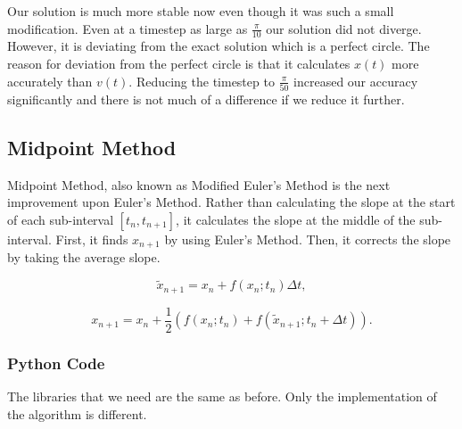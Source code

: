 \documentclass[11pt]{article}
\begin{document}
    Our solution is much more stable now even though it was such a small
modification. Even at a timestep as large as \(\frac{\pi}{10}\) our
solution did not diverge. However, it is deviating from the exact
solution which is a perfect circle. The reason for deviation from the
perfect circle is that it calculates \(x(t)\) more accurately than
\(v(t)\). Reducing the timestep to \(\frac{\pi}{50}\) increased our
accuracy significantly and there is not much of a difference if we
reduce it further.

    \hypertarget{midpoint-method}{%
\subsection{Midpoint Method}\label{midpoint-method}}

Midpoint Method, also known as Modified Euler's Method is the next
improvement upon Euler's Method. Rather than calculating the slope at
the start of each sub-interval \([t_n,t_{n+1}]\), it calculates the
slope at the middle of the sub-interval. First, it finds \(x_{n+1}\) by
using Euler's Method. Then, it corrects the slope by taking the average
slope.

\begin{equation}\label{eq:x_pred}
    \tilde{x}_{n+1} = x_n + f(x_n;t_n)\Delta t,
\end{equation}

\begin{equation}\label{eq:midpoint_method}
    x_{n+1} = x_n + \frac{1}{2}(f(x_n;t_n) + f(\tilde{x}_{n+1};t_n + \Delta t)).
\end{equation}

\hypertarget{python-code}{%
\subsubsection{Python Code}\label{python-code-3}}

The libraries that we need are the same as before. Only the
implementation of the algorithm is different.
\end{document}

